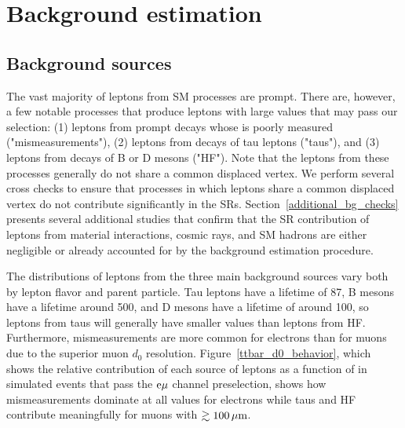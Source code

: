 \section{Background estimation}
\label{bg}

\subsection{Background sources}
\label{bg_sources}
The vast majority of leptons from SM processes are prompt. There are, however, a few notable processes that produce leptons with large \ad values that may pass our selection: (1) leptons from prompt decays whose \ad is poorly measured ("mismeasurements"), (2) leptons from  decays of tau leptons ("taus"), and (3) leptons from decays of B or D mesons ("HF"). Note that the leptons from these processes generally do not share a common displaced vertex. We perform several cross checks to ensure that processes in which leptons share a common displaced vertex do not contribute significantly in the SRs. Section~\ref{additional_bg_checks} presents several additional studies that confirm that the SR contribution of leptons from material interactions, cosmic rays, and SM hadrons are either negligible or already accounted for by the background estimation procedure.


The \ad distributions of leptons from the three main background sources vary both by lepton flavor and parent particle. Tau leptons have a lifetime of 87\mum, B mesons have a lifetime around 500\mum, and D mesons have a lifetime of around 100\mum, so leptons from taus will generally have smaller \ad values than leptons from HF. Furthermore, mismeasurements are more common for electrons than for muons due to the superior muon $d_0$ resolution. Figure~\ref{ttbar_d0_behavior}, which shows the relative contribution of each source of leptons as a function of \ad in simulated \ttbar events that pass the $\mathrm{e}{\mu}$ channel preselection, shows how mismeasurements dominate at all \ad values for electrons while taus and HF contribute meaningfully for muons with $\gtrsim100\,\mu\text{m}$.



